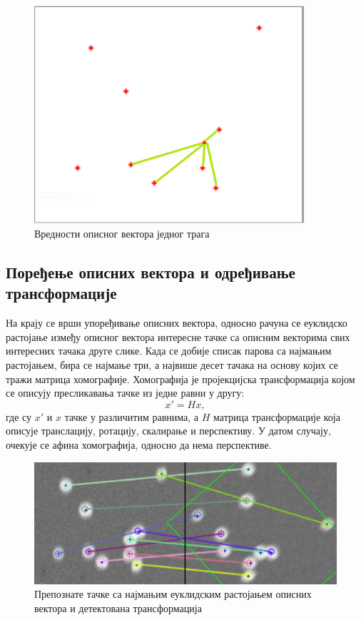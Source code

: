 \documentclass[11pt,a4paper,serbian,oneside]{book}
\begin{document}
\begin{figure}
\begin{center}
\includegraphics[width=100mm]{images/desc.png}
\end{center}
\caption{Вредности описног вектора једног трага}
\label{fig:desc}
\end{figure}

\subsection{Поређење описних вектора и одређивање трансформације}

На крају се врши упоређивање описних вектора, односно рачуна се еуклидско растојање између описног вектора интересне тачке са описним векторима свих интересних тачака друге слике.  Када се добије списак парова са најмањим растојањем, бира се најмање три, а највише десет тачака на основу којих се тражи матрица хомографије. Хомографија је пројекцијска трансформација којом се описују пресликавања тачке из једне равни у другу:
\begin{equation}
x \prime = H x,
\end{equation}
где су $x\prime$ и $x$ тачке у различитим равнима, а $H$ матрица трансформације која описује транслацију, ротацију, скалирање и перспективу. У датом случају, очекује се афина хомографија, односно да нема перспективе.

\begin{figure}[h]
\begin{center}
\includegraphics[width=150mm]{images/rotation.png}
\end{center}
\caption{Препознате тачке са најмањим еуклидским растојањем описних вектора и детектована трансформација}
\label{fig:rotation}
\end{figure}
\end{document}
